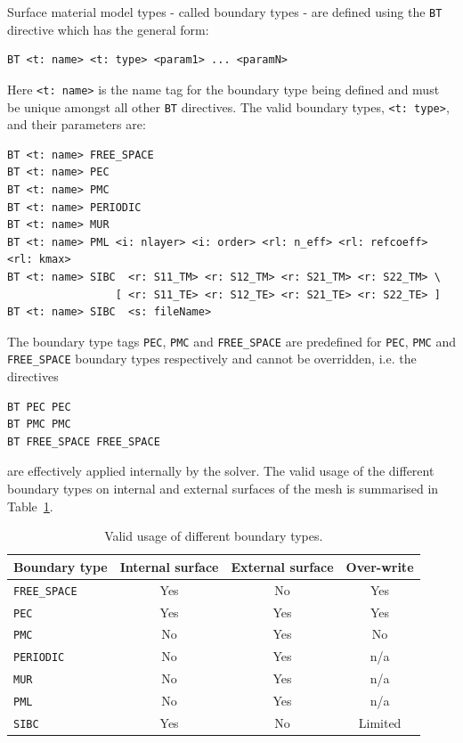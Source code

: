 \documentclass[onecolumn,a4paper]{article}
\numberwithin{equation}{section}
\begin{document}
Surface material model types - called boundary types - are defined using the \texttt{BT} directive 
which has the general form:
\begin{verbatim}
BT <t: name> <t: type> <param1> ... <paramN>
\end{verbatim}
Here \texttt{<t:~name>} is the name tag for the boundary type being defined and must be unique 
amongst all other \texttt{BT} directives. The valid boundary types, \texttt{<t:~type>}, and 
their parameters are:
\begin{verbatim}
BT <t: name> FREE_SPACE
BT <t: name> PEC
BT <t: name> PMC
BT <t: name> PERIODIC
BT <t: name> MUR
BT <t: name> PML <i: nlayer> <i: order> <rl: n_eff> <rl: refcoeff> <rl: kmax>
BT <t: name> SIBC  <r: S11_TM> <r: S12_TM> <r: S21_TM> <r: S22_TM> \
                 [ <r: S11_TE> <r: S12_TE> <r: S21_TE> <r: S22_TE> ]
BT <t: name> SIBC  <s: fileName>
\end{verbatim}
The boundary type tags \texttt{PEC}, \texttt{PMC} and \texttt{FREE\_SPACE} are predefined for \texttt{PEC}, \texttt{PMC} 
and \texttt{FREE\_SPACE} boundary types respectively and cannot be overridden, i.e. the directives 
\begin{verbatim}
BT PEC PEC
BT PMC PMC
BT FREE_SPACE FREE_SPACE
\end{verbatim}
are effectively applied internally by the solver. The valid usage of the
different boundary types on internal and external surfaces of the mesh is summarised in Table~\ref{tb:bt}.

\begin{table}[ht]
\begin{center}
\begin{tabular}{|l|c|c|c|}\hline
Boundary type         &Internal surface      &External surface  &Over-write \\  \hline
\texttt{FREE\_SPACE}  &Yes                   &No                &Yes        \\
\texttt{PEC}          &Yes                   &Yes               &Yes        \\
\texttt{PMC}          &No                    &Yes               &No         \\
\texttt{PERIODIC}     &No                    &Yes               &n/a        \\
\texttt{MUR}          &No                    &Yes               &n/a        \\
\texttt{PML}          &No                    &Yes               &n/a        \\
\texttt{SIBC}         &Yes                   &No                &Limited    \\ \hline
\end{tabular}
\caption{\label{tb:bt} Valid usage of different boundary types.}
\end{center}
\end{table}
\end{document}
